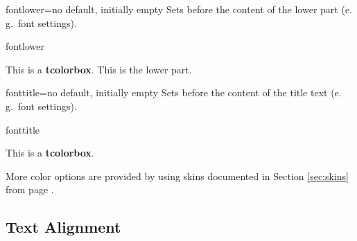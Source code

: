 \begin{docTcbKey}{fontlower}{=}{no default, initially empty}
  Sets  before the content of the lower part (e.\,g.\ font settings).
\begin{exdispExample}{fontlower}
\begin{tcolorbox}[fontlower=\sffamily\bfseries]
This is a \textbf{tcolorbox}.
\tcblower
This is the lower part.
\end{tcolorbox}
\end{exdispExample}
\end{docTcbKey}


\begin{docTcbKey}{fonttitle}{=}{no default, initially empty}
  Sets  before the content of the title text (e.\,g.\ font settings).
\begin{exdispExample}{fonttitle}
\begin{tcolorbox}[fonttitle=\sffamily\bfseries\large,title=Hello]
This is a \textbf{tcolorbox}.
\end{tcolorbox}
\end{exdispExample}
\end{docTcbKey}

\bigskip
\begin{marker}
  More color options are provided by using skins documented in
  Section \ref{sec:skins} from page \pageref{sec:skins}.
\end{marker}


\clearpage
\subsection{Text Alignment}

